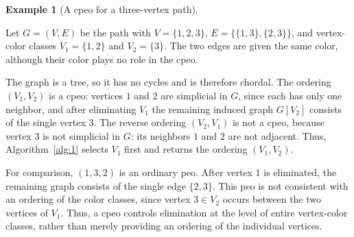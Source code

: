 \documentclass[12pt]{amsart}
\theoremstyle{plain}
\theoremstyle{definition}
\newtheorem{example}[theorem]{Example}
\theoremstyle{remark}
\newcommand{\1}{\mathbf{1}}
\begin{document}
\begin{example}[A cpeo for a three-vertex path]\label{ex:simple-cpeo}
\mbox{}\par\noindent
\begin{minipage}[c]{0.60\linewidth}
Let $G=(V,E)$ be the path with $V=\{1,2,3\}$,
$E=\bigl\{\{1,3\},\{2,3\}\bigr\}$, and vertex-color classes
$V_1=\{1,2\}$ and $V_2=\{3\}$. The two edges are given the same color,
although their color plays no role in the cpeo.
\end{minipage}
\hfill
{}
\par

The graph is a tree, so it has no cycles and is therefore chordal. The ordering $(V_1,V_2)$ is a cpeo:
vertices $1$ and $2$ are simplicial in $G$, since each has only one neighbor,
and after eliminating $V_1$ the remaining induced graph $G[V_2]$ consists of
the single vertex $3$. The reverse ordering $(V_2,V_1)$ is not a cpeo,
because vertex $3$ is not simplicial in $G$: its neighbors $1$ and $2$ are not
adjacent. Thus, Algorithm~\ref{alg:1} selects $V_1$ first and returns the
ordering $(V_1,V_2)$.

For comparison, $(1,3,2)$ is an ordinary peo. After vertex $1$ is eliminated,
the remaining graph consists of the single edge $\{2,3\}$. This peo is not
consistent with an ordering of the color classes, since vertex $3\in V_2$ occurs
between the two vertices of $V_1$. Thus, a cpeo controls elimination at the level
of entire vertex-color classes, rather than merely providing an ordering of the
individual vertices.
\end{example}
\end{document}

